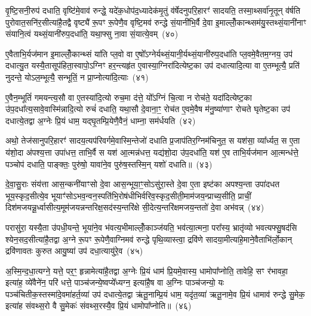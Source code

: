 {\anuvakamend[{सु॒व॒र्गमे॒व ता ए॒व च॒त्वारि॑ च}]}%

वृ॒ष्टि॒सनी॒रुप॑ दधाति॒ वृष्टि॑मे॒वाव॑ रुन्द्धे॒ यदे॑क॒धोप॑द॒ध्यादेक॑मृ॒तुं व॑र्\mbox{}षेदनुपरि॒हारꣳ॑ सादयति॒ तस्मा॒थ्सर्वा॑नृ॒तून् व॑र्\mbox{}षति पुरोवात॒सनि॑र॒सीत्या॑है॒तद्वै वृष्ट्यै॑ रू॒पꣳ रू॒पेणै॒व वृष्टि॒मव॑ रुन्द्धे सं॒यानी॑भि॒र्वै दे॒वा इ॒माल्लोँ॒कान्थ्सम॑यु॒स्तथ्सं॒यानी॑नाꣳ संयानि॒त्वं यथ्सं॒यानी॑रुप॒दधा॑ति॒ यथा॒फ्सु ना॒वा सं॒यात्ये॒वम्~(४०)

ए॒वैताभि॒र्यज॑मान इ॒माल्लोँ॒कान्थ्सं या॑ति प्ल॒वो वा ए॒षो᳚\-ऽग्नेर्यथ्सं॒यानी॒र्यथ्सं॒यानी॑रुप॒दधा॑ति प्ल॒वमे॒वैतम॒ग्नय॒ उप॑ दधात्यु॒त यस्यै॒तासूप॑हिता॒स्वापो॒\-ऽग्निꣳ हर॒न्त्यहृ॑त ए॒वास्या॒ग्निरा॑दित्येष्ट॒का उप॑ दधात्यादि॒त्या वा ए॒तम्भूत्यै॒ प्रति॑ नुदन्ते॒ यो\-ऽल॒म्भूत्यै॒ सन्भूतिं॒ न प्रा॒प्नोत्या॑दि॒त्याः~(४१)

ए॒वैन॒म्भूतिं॑ गमयन्त्य॒सौ वा ए॒तस्या॑दि॒त्यो रुच॒मा द॑त्ते॒ यो᳚\-ऽग्निं चि॒त्वा न रोच॑ते॒ यदा॑दित्येष्ट॒का उ॑प॒दधा᳚त्य॒सावे॒वास्मि॑न्नादि॒त्यो रुचं॑ दधाति॒ यथा॒सौ दे॒वाना॒ꣳ॒ रोच॑त ए॒वमे॒वैष म॑नु॒ष्या॑णाꣳ रोचते घृतेष्ट॒का उप॑ दधात्ये॒तद्वा अ॒ग्नेः प्रि॒यं धाम॒ यद्घृ॒तम्प्रि॒येणै॒वैनं॒ धाम्ना॒ सम॑र्धयति~(४२)

अथो॒ तेज॑सानुपरि॒हारꣳ॑ सादय॒त्यप॑रिवर्गमे॒वास्मि॒न्तेजो॑ दधाति प्र॒जाप॑तिर॒ग्निम॑चिनुत॒ स यश॑सा॒ व्या᳚र्ध्यत॒ स ए॒ता य॑शो॒दा अ॑पश्य॒त्ता उपा॑धत्त॒ ताभि॒र्वै स यश॑ आ॒त्मन्न॑धत्त॒ यद्य॑शो॒दा उ॑प॒दधा॑ति॒ यश॑ ए॒व ताभि॒र्यज॑मान आ॒त्मन्ध॑त्ते॒ पञ्चोप॑ दधाति॒ पाङ्क्तः॒ पुरु॑षो॒ यावा॑ने॒व पुरु॑ष॒स्तस्मि॒न् यशो॑ दधाति॥~(४३)

{\anuvakamend[{ए॒वं प्रा॒प्नोत्या॑दि॒त्या अ॑र्धय॒त्येका॒न्नप॑ञ्चा॒शच्च॑}]}%

दे॒वा॒सु॒राः संय॑त्ता आस॒न्कनी॑याꣳसो दे॒वा आस॒न्भूया॒ꣳ॒सो\-ऽसु॑रा॒स्ते दे॒वा ए॒ता इष्ट॑का अपश्य॒न्ता उपा॑दधत भूय॒स्कृद॒सीत्ये॒व भूयाꣳ॑सो\-ऽभव॒न्वन॒स्पति॑भि॒रोष॑धीभिर्वरिव॒स्कृद॒सीती॒माम॑जय॒न्प्राच्य॒सीति॒ प्राचीं॒ दिश॑मजयन्नू॒र्ध्वासीत्य॒मूम॑जयन्नन्तरिक्ष॒सद॑स्य॒न्तरि॑क्षे सी॒देत्य॒न्तरि॑क्षमजय॒न्ततो॑ दे॒वा अभ॑वन्न्~(४४)

परासु॑रा॒ यस्यै॒ता उ॑पधी॒यन्ते॒ भूया॑ने॒व भ॑वत्य॒भीमाल्लोँ॒काञ्ज॑यति॒ भव॑त्या॒त्मना॒ परा᳚स्य॒ भ्रातृ॑व्यो भवत्यफ्सु॒षद॑सि श्येन॒सद॒सीत्या॑है॒तद्वा अ॒ग्ने रू॒पꣳ रू॒पेणै॒वाग्निमव॑ रुन्द्धे पृथि॒व्यास्त्वा॒ द्रवि॑णे सादया॒मीत्या॑हे॒माने॒वैताभि॑र्लो॒कान् द्रवि॑णावतः कुरुत आयु॒ष्या॑ उप॑ दधा॒त्यायु॑रे॒व~(४५)

अ॒स्मि॒न्द॒धा॒त्यग्ने॒ यत्ते॒ पर॒ꣳ॒ हृन्नामेत्या॑है॒तद्वा अ॒ग्नेः प्रि॒यं धाम॑ प्रि॒यमे॒वास्य॒ धामोपा᳚प्नोति॒ तावेहि॒ सꣳ र॑भावहा॒ इत्या॑ह॒ व्ये॑वैने॑न॒ परि॑ धत्ते॒ पाञ्च॑जन्ये॒ष्वप्ये᳚ध्यग्न॒ इत्या॑है॒ष वा अ॒ग्निः पाञ्च॑जन्यो॒ यः पञ्च॑चितीक॒स्तस्मा॑दे॒वमा॑हर्त॒व्या॑ उप॑ दधात्ये॒तद्वा ऋ॑तू॒नाम्प्रि॒यं धाम॒ यदृ॑त॒व्या॑ ऋतू॒नामे॒व प्रि॒यं धामाव॑ रुन्द्धे सु॒मेक॒ इत्या॑ह संवथ्स॒रो वै सु॒मेकः॑ संवथ्स॒रस्यै॒व प्रि॒यं धामोपा᳚प्नोति॥~(४६)

